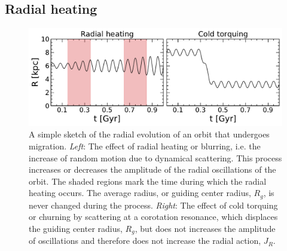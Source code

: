 \subsection{Radial heating}
\begin{figure}[t]
    \centering
    \includegraphics[width=1\textwidth]{images/radialmigration.pdf}
    \caption{A simple sketch of the radial evolution of an orbit that undergoes migration. \textit{Left}: The effect of radial heating or blurring, i.e. the increase of random motion due to dynamical scattering. This process increases or decreases the amplitude of the radial oscillations of the orbit. The shaded regions mark the time during which the radial heating occurs. The average radius, or guiding center radius, $R_g$, is never changed during the process. \textit{Right}: The effect of cold torquing or churning by scattering at a corotation resonance, which displaces the guiding center radius, $R_g$, but does not increases the amplitude of oscillations and therefore does not increase the radial action, $J_R$.} %
    \label{fig:radialmigration}
\end{figure}

